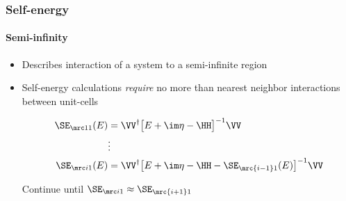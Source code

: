 \begin{frame}
  \frametitle{Self-energy}
  \framesubtitle{Semi-infinity}

  \begin{itemize}
    \item%
    Describes interaction of a system to a semi-infinite region

    \item%
    Self-energy calculations \emph{require} no more than nearest neighbor interactions between unit-cells

    \begin{align*}
      \SE_{\mrc 11}(E) &= \VV^\dagger\big[E+\im\eta-\HH\big]^{-1}\VV
      \\
      &\vdots
      \\
      \SE_{\mrc i1}(E) &= \VV^\dagger\big[E+\im\eta-\HH-\SE_{\mrc{i-1}1}(E)\big]^{-1}\VV
    \end{align*}

    Continue until $\SE_{\mrc i1}\approx\SE_{\mrc{i+1}1}$

    \begin{center}
    \end{center}

  \end{itemize}

\end{frame}



